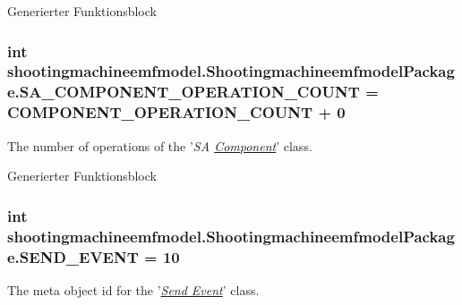 Generierter Funktionsblock  \hypertarget{interfaceshootingmachineemfmodel_1_1_shootingmachineemfmodel_package_a2585f235053982110c2dd90af019dca9}{
\subsubsection[{S\-A\-\_\-\-C\-O\-M\-P\-O\-N\-E\-N\-T\-\_\-\-O\-P\-E\-R\-A\-T\-I\-O\-N\-\_\-\-C\-O\-U\-N\-T}]{\setlength{\rightskip}{0pt plus 5cm}int shootingmachineemfmodel.\-Shootingmachineemfmodel\-Package.\-S\-A\-\_\-\-C\-O\-M\-P\-O\-N\-E\-N\-T\-\_\-\-O\-P\-E\-R\-A\-T\-I\-O\-N\-\_\-\-C\-O\-U\-N\-T = {\bf C\-O\-M\-P\-O\-N\-E\-N\-T\-\_\-\-O\-P\-E\-R\-A\-T\-I\-O\-N\-\_\-\-C\-O\-U\-N\-T} + 0}}\label{interfaceshootingmachineemfmodel_1_1_shootingmachineemfmodel_package_a2585f235053982110c2dd90af019dca9}
The number of operations of the '{\itshape S\-A \hyperlink{interfaceshootingmachineemfmodel_1_1_component}{Component}}' class.

Generierter Funktionsblock  \hypertarget{interfaceshootingmachineemfmodel_1_1_shootingmachineemfmodel_package_ab3c45188557a3e09f02d1f1e98ec9007}{
\subsubsection[{S\-E\-N\-D\-\_\-\-E\-V\-E\-N\-T}]{\setlength{\rightskip}{0pt plus 5cm}int shootingmachineemfmodel.\-Shootingmachineemfmodel\-Package.\-S\-E\-N\-D\-\_\-\-E\-V\-E\-N\-T = 10}}\label{interfaceshootingmachineemfmodel_1_1_shootingmachineemfmodel_package_ab3c45188557a3e09f02d1f1e98ec9007}
The meta object id for the '\hyperlink{classshootingmachineemfmodel_1_1impl_1_1_send_event_impl}{{\itshape Send Event}}' class.

